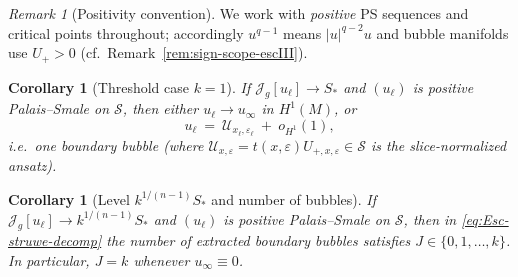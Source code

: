 \documentclass[11pt,reqno,a4paper]{amsart}
\numberwithin{equation}{section}
\theoremstyle{plain}
\newtheorem{corollary}[theorem]{Corollary}
\theoremstyle{remark}
\newtheorem{remark}[theorem]{Remark}
\theoremstyle{plain}
\begin{document}
\begin{remark}[Positivity convention]\label{rem:pos-convention}
We work with \emph{positive} PS sequences and critical points throughout; accordingly $u^{q-1}$
means $|u|^{q-2}u$ and bubble manifolds use $U_+>0$ (cf.\ Remark~\ref{rem:sign-scope-escIII}).
\end{remark}


\begin{corollary}[Threshold case $k=1$]
\label{cor:threshold-k1}
If $\mathcal J_g[u_\ell]\to S_\ast$ and $(u_\ell)$ is positive Palais--Smale on $\mathcal S$, then either $u_\ell\to u_\infty$ in $H^1(M)$, or
\[
u_\ell\ =\ \mathcal U_{x_\ell,\varepsilon_\ell}\ +\ o_{H^1}(1),
\]
i.e.\ one boundary bubble (where $\mathcal U_{x,\varepsilon}=t(x,\varepsilon)U_{+,x,\varepsilon}\in\mathcal S$
is the slice-normalized ansatz).
\end{corollary}

\begin{corollary}[Level $k^{1/(n-1)}S_\ast$ and number of bubbles]
\label{cor:level-kS}
If $\mathcal J_g[u_\ell]\to k^{1/(n-1)}S_\ast$ and $(u_\ell)$ is positive Palais--Smale on $\mathcal S$, then in \eqref{eq:Esc-struwe-decomp}
the number of extracted boundary bubbles satisfies $J\in\{0,1,\dots,k\}$.
In particular, $J=k$ whenever $u_\infty\equiv0$.
\end{corollary}
\end{document}
